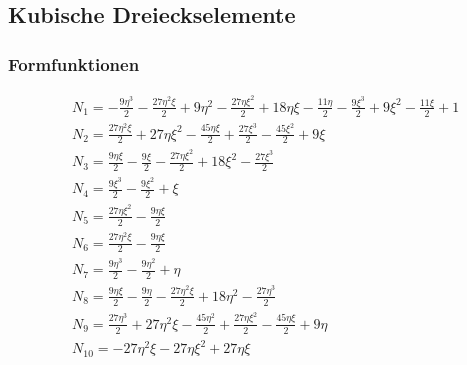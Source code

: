 \subsection{Kubische Dreieckselemente}
\label{sec:cubic_triangles_annex}
\subsubsection{Formfunktionen}

\begin{align*}
&N_1 = -\frac{9\eta ^3}{2}-\frac{27\eta ^2\xi}{2}+9\eta ^2-\frac{27\eta {\xi}^2}{2}+18\eta \xi-\frac{11\eta }{2}-\frac{9{\xi}^3}{2}+9{\xi}^2-\frac{11\xi}{2}+1\\
&N_2 = \frac{27\eta ^2\xi}{2}+27\eta {\xi}^2-\frac{45\eta \xi}{2}+\frac{27{\xi}^3}{2}-\frac{45{\xi}^2}{2}+9\xi \\
&N_3 = \frac{9\eta \xi}{2}-\frac{9\xi}{2}-\frac{27\eta {\xi}^2}{2}+18{\xi}^2-\frac{27{\xi}^3}{2}\\
&N_4 = \frac{9{\xi}^3}{2}-\frac{9{\xi}^2}{2}+\xi \\
&N_5 = \frac{27\eta {\xi}^2}{2}-\frac{9\eta \xi}{2}\\
&N_6 = \frac{27\eta ^2\xi}{2}-\frac{9\eta \xi}{2}\\
&N_7 = \frac{9\eta ^3}{2}-\frac{9\eta ^2}{2}+\eta \\
&N_8 = \frac{9\eta \xi}{2}-\frac{9\eta }{2}-\frac{27\eta ^2\xi}{2}+18\eta ^2-\frac{27\eta ^3}{2}\\
&N_9 = \frac{27\eta ^3}{2}+27\eta ^2\xi-\frac{45\eta ^2}{2}+\frac{27\eta {\xi}^2}{2}-\frac{45\eta \xi}{2}+9\eta \\
&N_{10} = -27\eta ^2\xi-27\eta {\xi}^2+27\eta \xi
\end{align*}

